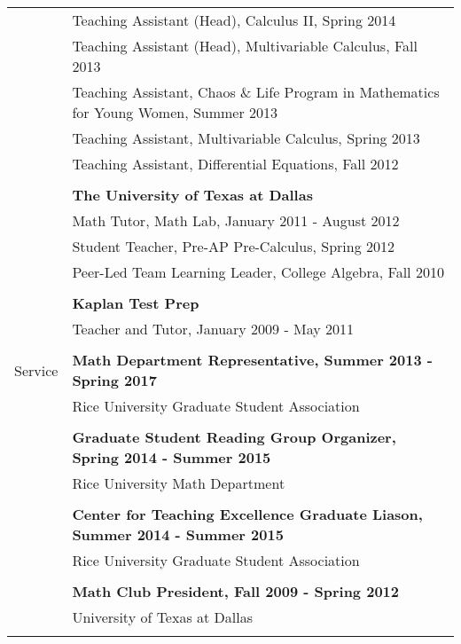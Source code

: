 \documentclass[letterpaper,11pt,oneside]{article}
\begin{document}
         \begin{tabular}{@{} l l}
        & Teaching Assistant (Head), Calculus II, Spring 2014 \\  
       & Teaching Assistant (Head), Multivariable Calculus, Fall 2013 \\
   & Teaching Assistant, Chaos \& Life Program in Mathematics for Young Women, Summer 2013 \\  
          & Teaching Assistant, Multivariable Calculus, Spring 2013 \\
       & Teaching Assistant, Differential Equations, Fall 2012 \\

       \Large{}   & \\
     &\textbf{The University of Texas at Dallas} \\
     & Math Tutor, Math Lab, January 2011 - August 2012 \\
     & Student Teacher, Pre-AP Pre-Calculus, Spring 2012 \\
          & Peer-Led Team Learning Leader, College Algebra, Fall 2010 \\
     & \\
     & \textbf{Kaplan Test Prep} \\
     & Teacher and Tutor, January 2009 - May 2011 \\
     & \\
     
	
       \Large{Service}   & \textbf{Math Department Representative, Summer 2013 - Spring 2017} \\
     & Rice University Graduate Student Association\\
     & \\

& \textbf{Graduate Student Reading Group Organizer, Spring 2014 - Summer 2015} \\
     & Rice University Math Department\\
     & \\

& \textbf{Center for Teaching Excellence Graduate Liason, Summer 2014 - Summer 2015} \\
     & Rice University Graduate Student Association\\
     & \\

 & \textbf{Math Club President, Fall 2009 - Spring 2012} \\
     & University of Texas at Dallas\\
     & \\

 
\end{tabular}
\end{document}
